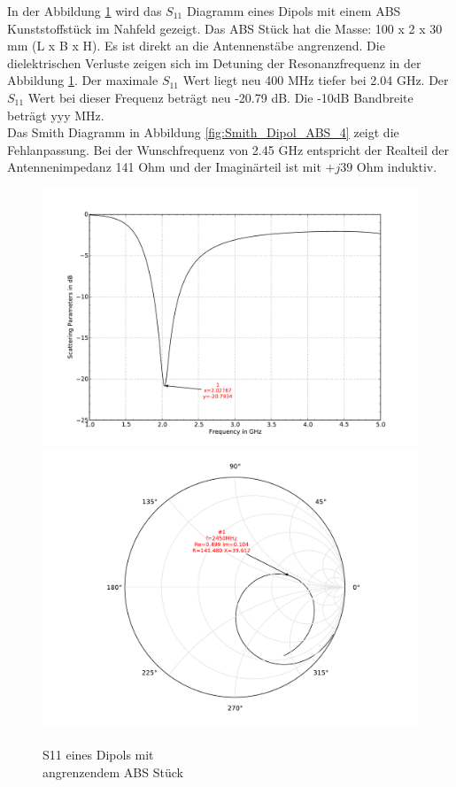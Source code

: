 In der Abbildung \ref{fig:S11_Dipol_ABS_3} wird das $S_{11}$ Diagramm eines Dipols mit einem ABS Kunststoffstück im Nahfeld gezeigt. Das ABS Stück hat die Masse: 100 x 2 x 30 mm (L x B x H). Es ist direkt an die Antennenstäbe angrenzend. Die dielektrischen Verluste zeigen sich im Detuning der Resonanzfrequenz in der Abbildung \ref{fig:S11_Dipol_ABS_3}. Der maximale $S_{11}$ Wert liegt neu 400 MHz tiefer bei 2.04 GHz. Der $S_{11}$ Wert bei dieser Frequenz beträgt  neu -20.79 dB. Die -10dB Bandbreite beträgt yyy MHz.\\
Das Smith Diagramm in Abbildung \ref{fig:Smith_Dipol_ABS_4} zeigt die Fehlanpassung. Bei der Wunschfrequenz von 2.45 GHz entspricht der Realteil der Antennenimpedanz 141 Ohm und der Imaginärteil ist mit $+j39$ Ohm induktiv.
\begin{figure}[!ht]
\begin{center}
  \includegraphics[width=\linewidth]{content/bilder/Evaluation/Dipol/S11DipolABS.pdf}
  \caption{\\S11 eines Dipols mit \\angrenzendem ABS Stück}\label{fig:S11_Dipol_ABS_3}
\endminipage%
{}
  \includegraphics[width=\linewidth]{content/bilder/Evaluation/Dipol/SmithDipolABS.pdf}

\end{center}
\end{figure}
